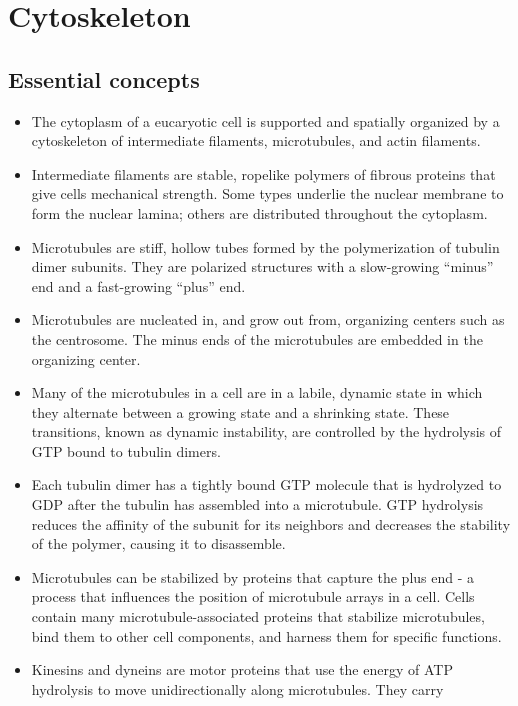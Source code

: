 \chapter{Cytoskeleton}



\section{Essential concepts}

\begin{itemize}
\item The cytoplasm of a eucaryotic cell is supported and spatially organized
by a cytoskeleton of intermediate filaments, microtubules, and
actin filaments.
\item Intermediate filaments are stable, ropelike polymers of fibrous proteins
that give cells mechanical strength. Some types underlie the
nuclear membrane to form the nuclear lamina; others are distributed
throughout the cytoplasm.
\item Microtubules are stiff, hollow tubes formed by the polymerization of
tubulin dimer subunits. They are polarized structures with a slow-growing
“minus” end and a fast-growing “plus” end.
\item Microtubules are nucleated in, and grow out from, organizing centers
such as the centrosome. The minus ends of the microtubules are
embedded in the organizing center.
\item Many of the microtubules in a cell are in a labile, dynamic state in
which they alternate between a growing state and a shrinking state.
These transitions, known as dynamic instability, are controlled by the
hydrolysis of GTP bound to tubulin dimers.
\item Each tubulin dimer has a tightly bound GTP molecule that is hydrolyzed
to GDP after the tubulin has assembled into a microtubule. GTP
hydrolysis reduces the affinity of the subunit for its neighbors and
decreases the stability of the polymer, causing it to disassemble.
\item Microtubules can be stabilized by proteins that capture the plus
end - a process that influences the position of microtubule arrays in
a cell. Cells contain many microtubule-associated proteins that stabilize
microtubules, bind them to other cell components, and harness
them for specific functions.
\item Kinesins and dyneins are motor proteins that use the energy of ATP
hydrolysis to move unidirectionally along microtubules. They carry

\end{itemize}
